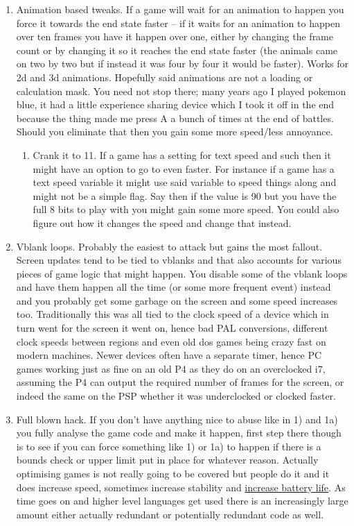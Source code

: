 \documentclass[
]{book}
\providecommand{\tightlist}{%
  \setlength{\itemsep}{0pt}\setlength{\parskip}{0pt}}
\begin{document}
\begin{enumerate}
\def\labelenumi{\arabic{enumi}.}
\item
  Animation based tweaks. If a game will wait for an animation to happen you force it towards the end state faster -- if it waits for an animation to happen over ten frames you have it happen over one, either by changing the frame count or by changing it so it reaches the end state faster (the animals came on two by two but if instead it was four by four it would be faster). Works for 2d and 3d animations. Hopefully said animations are not a loading or calculation mask. You need not stop there; many years ago I played pokemon blue, it had a little experience sharing device which I took it off in the end because the thing made me press A a bunch of times at the end of battles. Should you eliminate that then you gain some more speed/less annoyance.

  \begin{enumerate}
  \def\labelenumii{\arabic{enumii}.}
  \tightlist
  \item
    Crank it to 11. If a game has a setting for text speed and such then it might have an option to go to even faster. For instance if a game has a text speed variable it might use said variable to speed things along and might not be a simple flag. Say then if the value is 90 but you have the full 8 bits to play with you might gain some more speed. You could also figure out how it changes the speed and change that instead.
  \end{enumerate}
\item
  Vblank loops. Probably the easiest to attack but gains the most fallout. Screen updates tend to be tied to vblanks and that also accounts for various pieces of game logic that might happen. You disable some of the vblank loops and have them happen all the time (or some more frequent event) instead and you probably get some garbage on the screen and some speed increases too. Traditionally this was all tied to the clock speed of a device which in turn went for the screen it went on, hence bad PAL conversions, different clock speeds between regions and even old dos games being crazy fast on modern machines. Newer devices often have a separate timer, hence PC games working just as fine on an old P4 as they do on an overclocked i7, assuming the P4 can output the required number of frames for the screen, or indeed the same on the PSP whether it was underclocked or clocked faster.
\item
  Full blown hack. If you don't have anything nice to abuse like in 1) and 1a) you fully analyse the game code and make it happen, first step there though is to see if you can force something like 1) or 1a) to happen if there is a bounds check or upper limit put in place for whatever reason. Actually optimising games is not really going to be covered but people do it and it does increase speed, sometimes increase stability and \href{http://www.dwedit.org/dwedit_board/viewtopic.php?id=480}{increase battery life}. As time goes on and higher level languages get used there is an increasingly large amount either actually redundant or potentially redundant code as well.
\end{enumerate}
\end{document}
